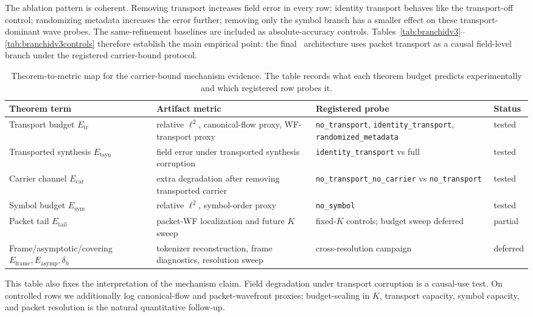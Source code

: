 

The ablation pattern is coherent.  Removing transport increases field error in every row; identity transport behaves like the transport-off control; randomizing metadata increases the error further; removing only the symbol branch has a smaller effect on these transport-dominant wave probes.  The same-refinement baselines are included as absolute-accuracy controls.  Tables~\ref{tab:branchidv3}--\ref{tab:branchidv3controls} therefore establish the main empirical point: the final \MiNO\ architecture uses packet transport as a causal field-level branch under the registered carrier-bound protocol.

\begin{table}[t]
\centering
\caption{Theorem-to-metric map for the carrier-bound mechanism evidence.  The table records what each theorem budget predicts experimentally and which registered row probes it.}
\label{tab:theorem-metric-map}
\scriptsize
\begin{tabular}{p{}p{}p{}p{}}
\toprule
Theorem term & Artifact metric & Registered probe & Status \\
\midrule
Transport budget $E_{\mathrm{tr}}$ & relative $\ell^2$, canonical-flow proxy, WF-transport proxy & \texttt{no\_transport}, \texttt{identity\_transport}, \texttt{randomized\_metadata} & tested \\
Transported synthesis $E_{\mathrm{tsyn}}$ & field error under transported synthesis corruption & \texttt{identity\_transport} vs full & tested \\
Carrier channel $E_{\mathrm{car}}$ & extra degradation after removing transported carrier & \texttt{no\_transport\_no\_carrier} vs \texttt{no\_transport} & tested \\
Symbol budget $E_{\mathrm{sym}}$ & relative $\ell^2$, symbol-order proxy & \texttt{no\_symbol} & tested \\
Packet tail $E_{\mathrm{tail}}$ & packet-WF localization and future $K$ sweep & fixed-$K$ controls; budget sweep deferred & partial \\
Frame/asymptotic/covering $E_{\mathrm{frame}},E_{\mathrm{asymp}},\delta_h$ & tokenizer reconstruction, frame diagnostics, resolution sweep & cross-resolution campaign & deferred \\
\bottomrule
\end{tabular}
\end{table}

This table also fixes the interpretation of the mechanism claim.  Field degradation under transport corruption is a causal-use test.  On controlled rows we additionally log canonical-flow and packet-wavefront proxies; budget-scaling in $K$, transport capacity, symbol capacity, and packet resolution is the natural quantitative follow-up.

